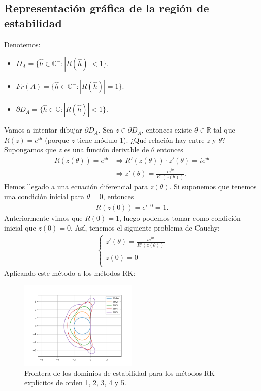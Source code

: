 \subsection{Representación gráfica de la región de estabilidad}
Denotemos:
\begin{itemize}
    \item $D_A = \{ \hat{h} \in \mathbb{C}^- : |R(\hat{h})| < 1\}$.
    \item $Fr(A) = \{ \hat{h} \in \mathbb{C}^- : |R(\hat{h})| = 1\}$.
    \item $\partial D_A = \{ \hat{h} \in \mathbb{C} : |R(\hat{h})| < 1\}$.
\end{itemize}
Vamos a intentar dibujar $\partial D_A$. Sea $z \in \partial D_A$, entonces existe $\theta \in \mathbb{R}$ tal que $R(z) = e^{i\theta}$ (porque $z$ tiene módulo 1). ¿Qué relación hay entre $z$ y $\theta$? Supongamos que $z$ es una función derivable de $\theta$  entonces
\begin{align*}
    R(z(\theta)) = e^{i\theta} & \Longrightarrow R'(z(\theta)) \cdot z'(\theta) = ie^{i\theta}    \\
                               & \Longrightarrow z'(\theta) = \frac{ie^{i\theta}}{R'(z(\theta))}.
\end{align*}
Hemos llegado a una ecuación diferencial para $z(\theta)$. Si suponemos que tenemos una condición inicial para $\theta = 0$, entonces
\begin{align*}
    R(z(0)) = e^{i \cdot 0} = 1.
\end{align*}
Anteriormente vimos que $R(0) = 1$, luego podemos tomar como condición inicial que $z(0) = 0$. Así, tenemos el siguiente problema de Cauchy:
\begin{align*}
    \left\{ \begin{array}{lcc}
                z'(\theta) = \frac{ie^{i\theta}}{R'(z(\theta))} \\
                \\ z(0) = 0\\
            \end{array}
    \right.
\end{align*}
Aplicando este método a los métodos RK:

\begin{figure}[H]
    \centering
    \includegraphics[width=0.5\textwidth]{imagenes/RK_explicitos.png}
    \caption*{Frontera de los dominios de estabilidad para los métodos RK explícitos de orden 1, 2, 3, 4 y 5.}
\end{figure}

